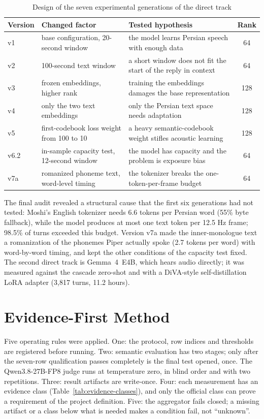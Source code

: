 \begin{table}[ht]
\centering
\caption{Design of the seven experimental generations of the direct track}
\label{tab:moshi-design}
\small
\begin{tabular}{lL{3.6cm}L{5.0cm}c}
\toprule
\textbf{Version} & \textbf{Changed factor} & \textbf{Tested hypothesis} &
\textbf{Rank} \\
\midrule
v1 & base configuration, 20-second window &
the model learns Persian speech with enough data & 64 \\
v2 & 100-second text window &
a short window does not fit the start of the reply in context & 64 \\
v3 & frozen embeddings, higher rank &
training the embeddings damages the base representation & 128 \\
v4 & only the two text embeddings &
only the Persian text space needs adaptation & 128 \\
v5 & first-codebook loss weight from 100 to 10 &
a heavy semantic-codebook weight stifles acoustic learning & 128 \\
v6.2 & in-sample capacity test, 12-second window &
the model has capacity and the problem is exposure bias & 64 \\
v7a & romanized phoneme text, word-level timing &
the tokenizer breaks the one-token-per-frame budget & 64 \\
\bottomrule
\end{tabular}
\end{table}

The final audit revealed a structural cause that the first six generations had
not tested: Moshi's English tokenizer needs 6.6 tokens per Persian word (55\%
byte fallback), while the model produces at most one text token per 12.5 Hz
frame; 98.5\% of turns exceeded this budget. Version v7a made the inner-monologue
text a romanization of the phonemes Piper actually spoke (2.7 tokens per word)
with word-by-word timing, and kept the other conditions of the capacity test
fixed. The second direct track is Gemma~4~E4B, which hears audio directly; it was
measured against the cascade zero-shot and with a DiVA-style self-distillation
LoRA adapter (3,817 turns, 11.2 hours).

\clearpage
\section{Evidence-First Method}
\label{sec:evidence-first}

Five operating rules were applied. One: the protocol, row indices and thresholds
are registered before running. Two: semantic evaluation has two stages; only
after the seven-row qualification passes completely is the final test opened,
once. The Qwen3.8-27B-FP8 judge runs at temperature zero, in blind order and
with two repetitions. Three: result artifacts are write-once. Four: each
measurement has an evidence class (Table~\ref{tab:evidence-classes}), and only
the official class can prove a requirement of the project definition. Five: the
aggregator fails closed; a missing artifact or a class below what is needed makes
a condition fail, not ``unknown''.


